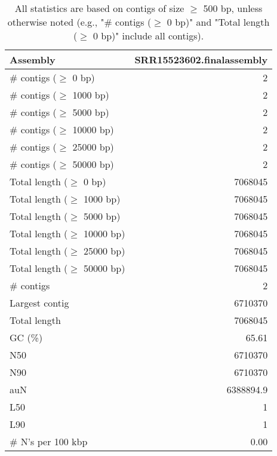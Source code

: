 \documentclass[12pt,a4paper]{article}
\begin{document}
\begin{table}[ht]
\begin{center}
\caption{All statistics are based on contigs of size $\geq$ 500 bp, unless otherwise noted (e.g., "\# contigs ($\geq$ 0 bp)" and "Total length ($\geq$ 0 bp)" include all contigs).}
\begin{tabular}{|l*{1}{|r}|}
\hline
Assembly & SRR15523602.finalassembly \\ \hline
\# contigs ($\geq$ 0 bp) & 2 \\ \hline
\# contigs ($\geq$ 1000 bp) & 2 \\ \hline
\# contigs ($\geq$ 5000 bp) & 2 \\ \hline
\# contigs ($\geq$ 10000 bp) & 2 \\ \hline
\# contigs ($\geq$ 25000 bp) & 2 \\ \hline
\# contigs ($\geq$ 50000 bp) & 2 \\ \hline
Total length ($\geq$ 0 bp) & 7068045 \\ \hline
Total length ($\geq$ 1000 bp) & 7068045 \\ \hline
Total length ($\geq$ 5000 bp) & 7068045 \\ \hline
Total length ($\geq$ 10000 bp) & 7068045 \\ \hline
Total length ($\geq$ 25000 bp) & 7068045 \\ \hline
Total length ($\geq$ 50000 bp) & 7068045 \\ \hline
\# contigs & 2 \\ \hline
Largest contig & 6710370 \\ \hline
Total length & 7068045 \\ \hline
GC (\%) & 65.61 \\ \hline
N50 & 6710370 \\ \hline
N90 & 6710370 \\ \hline
auN & 6388894.9 \\ \hline
L50 & 1 \\ \hline
L90 & 1 \\ \hline
\# N's per 100 kbp & 0.00 \\ \hline
\end{tabular}
\end{center}
\end{table}
\end{document}
